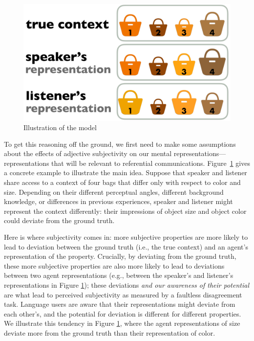 \documentclass[10pt,a4paper]{article}
\begin{document}
\begin{figure}[t]
  \centering
 \includegraphics[width=\linewidth]{model_picture.pdf} 
  \caption{Illustration of the model}
  \label{fig:ModelIllustration}
\end{figure}

To get this reasoning off the ground, we first need to make some assumptions about the effects of adjective subjectivity on our mental representations---representations that will be relevant to referential communications. Figure~\ref{fig:ModelIllustration} gives a concrete example to illustrate the main idea. Suppose that speaker and listener share access to a context of four bags that differ only with respect to color and size. Depending on their different perceptual angles, different background knowledge, or differences in previous experiences, speaker and listener might represent the context differently: their impressions of object size and object color could deviate from the ground truth. 

Here is where subjectivity comes in: more subjective properties are more likely to lead to deviation between the ground truth (i.e., the true context) and an agent's representation of the property. Crucially, by deviating from the ground truth, these more subjective properties are also more likely to lead to deviations between two agent representations (e.g., between the speaker's and listener's representations in Figure \ref{fig:ModelIllustration}); these deviations \emph{and our awareness of their potential} are what lead to perceived subjectivity as measured by a faultless disagreement task. Language users are aware that their representations might deviate from each other's, and the potential for deviation is different for different properties. We illustrate this tendency in Figure \ref{fig:ModelIllustration}, where the agent representations of size deviate more from the ground truth than their representation of color.
\end{document}
